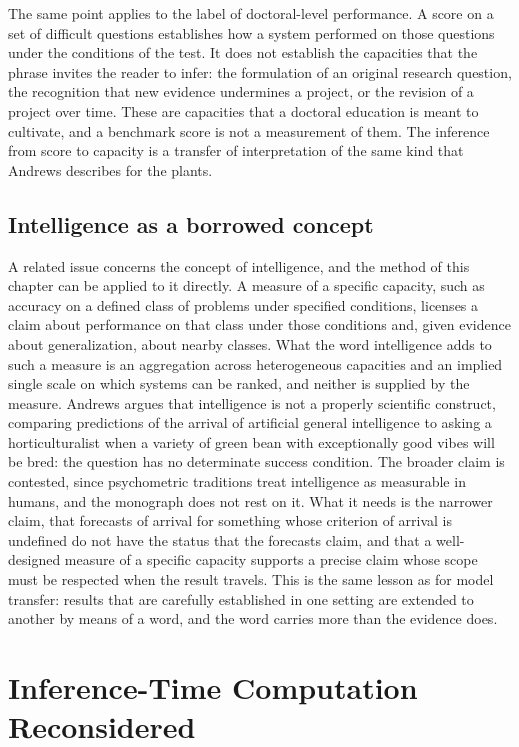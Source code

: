 \documentclass[11pt]{report}
\theoremstyle{remark}
\theoremstyle{definition}
\begin{document}
The same point applies to the label of doctoral-level performance. A score on a set of difficult questions establishes how a system performed on those questions under the conditions of the test. It does not establish the capacities that the phrase invites the reader to infer: the formulation of an original research question, the recognition that new evidence undermines a project, or the revision of a project over time. These are capacities that a doctoral education is meant to cultivate, and a benchmark score is not a measurement of them. The inference from score to capacity is a transfer of interpretation of the same kind that Andrews describes for the plants.

\section{Intelligence as a borrowed concept}

A related issue concerns the concept of intelligence, and the method of this chapter can be applied to it directly. A measure of a specific capacity, such as accuracy on a defined class of problems under specified conditions, licenses a claim about performance on that class under those conditions and, given evidence about generalization, about nearby classes. What the word intelligence adds to such a measure is an aggregation across heterogeneous capacities and an implied single scale on which systems can be ranked, and neither is supplied by the measure. Andrews argues that intelligence is not a properly scientific construct, comparing predictions of the arrival of artificial general intelligence to asking a horticulturalist when a variety of green bean with exceptionally good vibes will be bred: the question has no determinate success condition. The broader claim is contested, since psychometric traditions treat intelligence as measurable in humans, and the monograph does not rest on it. What it needs is the narrower claim, that forecasts of arrival for something whose criterion of arrival is undefined do not have the status that the forecasts claim, and that a well-designed measure of a specific capacity supports a precise claim whose scope must be respected when the result travels. This is the same lesson as for model transfer: results that are carefully established in one setting are extended to another by means of a word, and the word carries more than the evidence does.

\chapter{Inference-Time Computation Reconsidered}\label{ch:inference}
\end{document}
